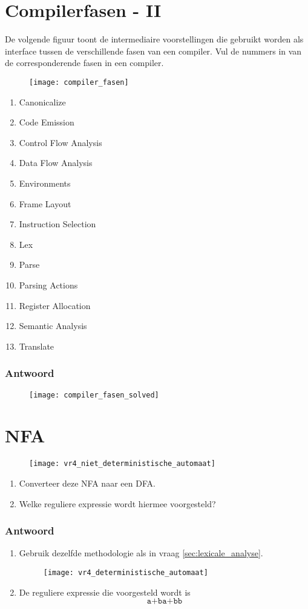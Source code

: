 \documentclass{report}
\newcommand{\answer}[1]{
		\subsubsection*{Antwoord}
			#1
}
\begin{document}
	\newpage
	\section{Compilerfasen - II}
	
	De volgende figuur toont de intermediaire voorstellingen die gebruikt worden als interface tussen de verschillende fasen van een compiler. Vul de nummers in van de corresponderende fasen in een compiler.
	\begin{figure}[ht]
		\texttt{[image: compiler\_fasen]}
	\end{figure}
	\begin{enumerate}
		\item Canonicalize
		\item Code Emission
		\item Control Flow Analysis
		\item Data Flow Analysis
		\item Environments
		\item Frame Layout
		\item Instruction Selection
		\item Lex
		\item Parse
		\item Parsing Actions
		\item Register Allocation
		\item Semantic Analysis
		\item Translate
	\end{enumerate}
	\answer{
		\begin{figure}[ht]
			\texttt{[image: compiler\_fasen\_solved]}
		\end{figure}
	}

	\newpage
	\section{NFA}
	\begin{figure}[ht]
		\texttt{[image: vr4\_niet\_deterministische\_automaat]}
	\end{figure}
	\begin{enumerate}
		\item Converteer deze NFA naar een DFA.
		\item Welke reguliere expressie wordt hiermee voorgesteld?
	\end{enumerate}
	\answer{
		\begin{enumerate}
			\item Gebruik dezelfde methodologie als in vraag \ref{sec:lexicale_analyse}.	\begin{figure}[ht]
				\centering
				\texttt{[image: vr4\_deterministische\_automaat]}
			\end{figure}
		\item De reguliere expressie die voorgesteld wordt is $$\texttt{a+ba+bb}$$
		\todo{hoe bekomen}
		\end{enumerate}
	}
\end{document}
